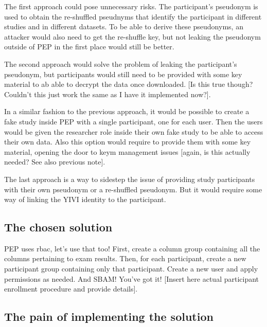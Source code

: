 \documentclass{report}
\begin{document}
The first approach could pose unnecessary risks. The participant's pseudonym is used to obtain the re-shuffled pseudnyms that identify the participant in different studies and in
different datasets. To be able to derive these pseudonyms, an attacker would also need to get the re-shuffle key, but not leaking the pseudonym outside of PEP in the first place would still be
better. \par
The second approach would solve the problem of leaking the participant's pseudonym, but participants would still need to be provided with some key material to ab able to decrypt
the data once downloaded. [Is this true though? Couldn't this just work the same as I have it implemented now?]. \par
In a similar fashion to the previous approach, it would be possible to create a fake study inside PEP with a single participant, one for each user. Then the users would be given
the researcher role inside their own fake study to be able to access their own data. Also this option would require to provide them with some key material, opening the door to keym
management issues [again, is this actually needed? See also previous note]. \par
The last approach is a way to sidestep the issue of providing study participants with their own pseudonym or a re-shuffled pseudonym. But it would require some way of linking the
YIVI identity to the participant.\par

\subsection{The chosen solution}
PEP uses rbac, let's use that too! First, create a column group containing all the columns pertaining to exam results. Then, for each participant, create a new participant group
containing only that participant. Create a new user and apply permissions as needed. And SBAM! You've got it! [Insert here actual participant enrollment procedure and provide
details].
\subsection{The pain of implementing the solution}
\fi


\printbibliography
\end{document}
